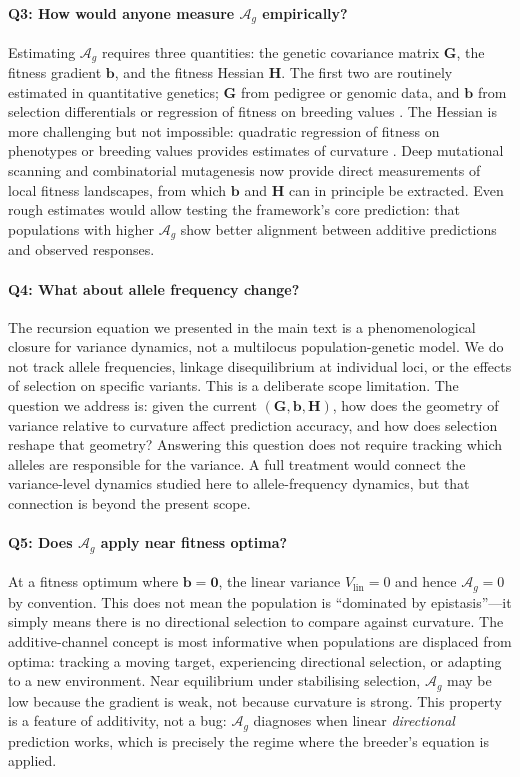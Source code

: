\documentclass[9pt,twocolumn,twoside,lineno]{gsajnl}
\newcommand{\vect}[1]{\boldsymbol{#1}}
\newcommand{\mat}[1]{\mathbf{#1}}
\newcommand{\Ag}{\ensuremath{\mathcal{A}_{g}}\xspace}
\newcommand{\Vlin}{\ensuremath{V_{\text{lin}}}\xspace}
\begin{document}
\paragraph{Q3: How would anyone measure \Ag empirically?}

Estimating \Ag requires three quantities: the genetic covariance matrix $\mat{G}$, the fitness gradient $\vect{b}$, and the fitness Hessian $\mat{H}$. The first two are routinely estimated in quantitative genetics; $\mat{G}$ from pedigree or genomic data, and $\vect{b}$ from selection differentials or regression of fitness on breeding values \citep{LandeArnold1983}. The Hessian is more challenging but not impossible: quadratic regression of fitness on phenotypes or breeding values provides estimates of curvature \citep{PhillipsArnold1989, BlowsBrooks2003}. Deep mutational scanning and combinatorial mutagenesis now provide direct measurements of local fitness landscapes, from which $\vect{b}$ and $\mat{H}$ can in principle be extracted. Even rough estimates would allow testing the framework's core prediction: that populations with higher \Ag show better alignment between additive predictions and observed responses.

\paragraph{Q4: What about allele frequency change?}

The recursion equation we presented in the main text is a phenomenological closure for variance dynamics, not a multilocus population-genetic model. We do not track allele frequencies, linkage disequilibrium at individual loci, or the effects of selection on specific variants. This is a deliberate scope limitation. The question we address is: given the current $(\mat{G}, \vect{b}, \mat{H})$, how does the geometry of variance relative to curvature affect prediction accuracy, and how does selection reshape that geometry? Answering this question does not require tracking which alleles are responsible for the variance. A full treatment would connect the variance-level dynamics studied here to allele-frequency dynamics, but that connection is beyond the present scope.

\paragraph{Q5: Does \Ag apply near fitness optima?}

At a fitness optimum where $\vect{b} = \vect{0}$, the linear variance $\Vlin = 0$ and hence $\Ag = 0$ by convention. This does not mean the population is ``dominated by epistasis''---it simply means there is no directional selection to compare against curvature. The additive-channel concept is most informative when populations are displaced from optima: tracking a moving target, experiencing directional selection, or adapting to a new environment. Near equilibrium under stabilising selection, \Ag may be low because the gradient is weak, not because curvature is strong. This property is a feature of additivity, not a bug: \Ag diagnoses when linear \emph{directional} prediction works, which is precisely the regime where the breeder's equation is applied.
\end{document}
